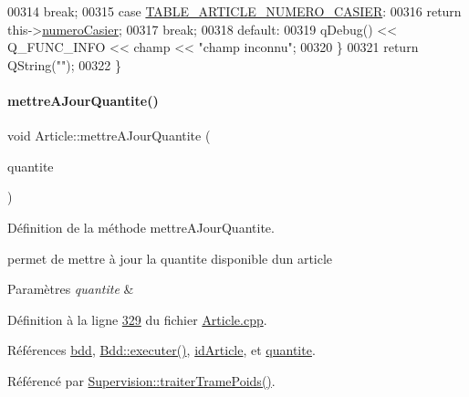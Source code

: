 \begin{DoxyCode}
00314             \textcolor{keywordflow}{break};
00315         \textcolor{keywordflow}{case} \hyperlink{_article_8h_a159354683cfd6e1b578172fbe6490ab6a43ae9bea39dd3f12e8732bcd2d7c0223}{TABLE\_ARTICLE\_NUMERO\_CASIER}:
00316             \textcolor{keywordflow}{return} this->\hyperlink{class_article_a4b8dd9598cc16200c60c7f55196fc26d}{numeroCasier};
00317             \textcolor{keywordflow}{break};
00318         \textcolor{keywordflow}{default}:
00319             qDebug() << Q\_FUNC\_INFO << champ << \textcolor{stringliteral}{"champ inconnu"};
00320     \}
00321     \textcolor{keywordflow}{return} QString(\textcolor{stringliteral}{""});
00322 \}
\end{DoxyCode}
\mbox{\label{class_article_a5777f36d74974ff21e712a9875c2d8bf}} 
\paragraph{\texorpdfstring{mettre\+A\+Jour\+Quantite()}{mettreAJourQuantite()}}
{\footnotesize\ttfamily void Article\+::mettre\+A\+Jour\+Quantite (\begin{DoxyParamCaption}\item[{Q\+String}]{quantite }\end{DoxyParamCaption})}



Définition de la méthode mettre\+A\+Jour\+Quantite. 

permet de mettre à jour la quantite disponible d\textquotesingle{}un article 
\begin{DoxyParams}{Paramètres}
{\em quantite} & \\
\hline
\end{DoxyParams}


Définition à la ligne \hyperlink{_article_8cpp_source_l00329}{329} du fichier \hyperlink{_article_8cpp_source}{Article.\+cpp}.



Références \hyperlink{_article_8h_source_l00082}{bdd}, \hyperlink{_bdd_8cpp_source_l00146}{Bdd\+::executer()}, \hyperlink{_article_8h_source_l00084}{id\+Article}, et \hyperlink{_article_8h_source_l00092}{quantite}.



Référencé par \hyperlink{_supervision_8cpp_source_l00370}{Supervision\+::traiter\+Trame\+Poids()}.


